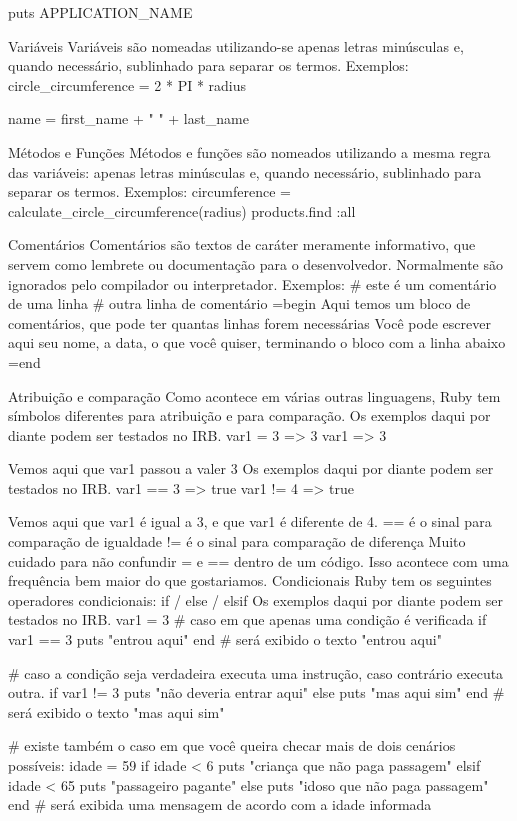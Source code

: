 \documentclass[12pt]{book} %
\begin{document}
puts APPLICATION\_NAME

Variáveis
Variáveis são nomeadas utilizando-se apenas letras minúsculas e, quando necessário, sublinhado para separar os termos.
Exemplos:
circle\_circumference = 2 * PI * radius

name = first\_name + " " + last\_name

Métodos e Funções
Métodos e funções são nomeados utilizando a mesma regra das variáveis: apenas letras minúsculas e, quando necessário, sublinhado para separar os termos.
Exemplos:
circumference = calculate\_circle\_circumference(radius)
products.find :all

Comentários
Comentários são textos de caráter meramente informativo, que servem como lembrete ou documentação para o desenvolvedor. Normalmente são ignorados pelo compilador ou interpretador.
Exemplos:
\# este é um comentário de uma linha
\# outra linha de comentário
=begin
Aqui temos um bloco de comentários, que pode ter quantas linhas forem necessárias
Você pode escrever aqui seu nome, a data, o que você quiser, terminando o bloco com a linha abaixo
=end

Atribuição e comparação
Como acontece em várias outras linguagens, Ruby tem símbolos diferentes para atribuição e para comparação.
Os exemplos daqui por diante podem ser testados no IRB.
var1 = 3
=> 3
var1
=> 3

Vemos aqui que var1 passou a valer 3
Os exemplos daqui por diante podem ser testados no IRB.
var1 == 3
=> true
var1 != 4
=> true

Vemos aqui que var1 é igual a 3, e que var1 é diferente de 4. 
== é o sinal para comparação de igualdade
!= é o sinal para comparação de diferença
Muito cuidado para não confundir = e == dentro de um código. Isso acontece com uma frequência bem maior do que gostariamos.
Condicionais
Ruby tem os seguintes operadores condicionais:
if / else / elsif
Os exemplos daqui por diante podem ser testados no IRB.
var1 = 3
\# caso em que apenas uma condição é verificada
if var1 == 3
  puts "entrou aqui"
end
\# será exibido o texto "entrou aqui"

\# caso a condição seja verdadeira executa uma instrução, caso contrário executa outra. 
if var1 != 3
  puts "não deveria entrar aqui"
else
  puts "mas aqui sim"
end
\# será exibido o texto "mas aqui sim"

\# existe também o caso em que você queira checar mais de dois cenários possíveis:
idade = 59
if idade < 6
  puts "criança que não paga passagem"
elsif idade < 65
  puts "passageiro pagante"
else
  puts "idoso que não paga passagem"
end
\# será exibida uma mensagem de acordo com a idade informada
\end{document}
